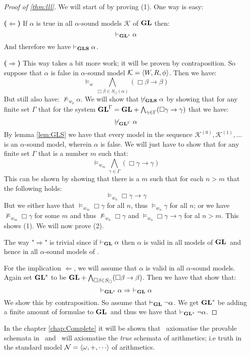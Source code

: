 \documentclass[../main.tex]{subfiles}
\begin{document}
\begin{proof}[Proof of \ref{thm:lll}]
	We will start of by proving (1). One way is easy:

	\textbf{($\Leftarrow$)} If $\alpha$ is true in all $\alpha$-sound
	models $\mathcal{K}$ of $\text{\textbf{GL}}$ then:
	$$\vdash_{\text{\textbf{GL}}^s}\alpha$$
	And therefore we have $\vdash_{\text{\textbf{GLS}}}\alpha$.

	\textbf{($\Rightarrow$)} This way takes a bit more work; it will be
	proven by contraposition. So suppose that $\alpha$ is false in
	$\alpha$-sound model $\mathcal{K}=\langle W,R,\phi\rangle$. Then we have:
	$$\vDash_w\bigwedge_{\Box\beta\in
	S_\Box(\alpha)}(\Box\beta\rightarrow\beta)$$
	But still also have: $\not\vDash_{w_0}\alpha$. We will show that
	$\not\vdash_{\text{\textbf{GLS}}}\alpha$ by showing that for any finite set $\Gamma$
	that for the system
	$\text{\textbf{GL}}^\Gamma=\text{\textbf{GL}}+\bigwedge_{\gamma\in\Gamma}(\Box\gamma\rightarrow\gamma)$
	that we have:
	$$\not\vdash_{\text{\textbf{GL}}^\Gamma}\alpha$$
	By lemma \ref{lem:GLS} we have that every  model in the sequence
	$\mathcal{K}^{(0)},\mathcal{K}^{(1)},\ldots$ is an $\alpha$-sound
	model, wherein $\alpha$ is false. We will just have to show that for
	any finite set $\Gamma$ that is a number $m$ such that:
	$$\vDash_{w_m}\bigwedge_{\gamma\in\Gamma}(\Box\gamma\rightarrow\gamma)$$
	This can be shown by showing that there is a $m$ such that for each
	$n>m$ that the following holds:
	$$\vDash_{w_n}\Box\gamma\rightarrow\gamma$$
	But we either have that $\vDash_{w_m}\Box\gamma$ for all $n$, thus
	$\vDash_{w_n}\gamma$ for all $n$; or we have
	$\not\vDash_{w_m}\Box\gamma$ for some $m$ and thus
	$\not\vDash_{w_n}\Box\gamma$ and
	$\vDash_{w_n}\Box\gamma\rightarrow\gamma$ for al $n>m$. This shows (1).
	We will now prove (2).

	The way "$\Rightarrow$" is trivial since if $\vdash_{\text{\textbf{GL}}}\alpha$ then
	$\alpha$ is valid in all models of $\text{\textbf{GL}}$\ and hence in all
	$\alpha$-sound models of \GL.
	
	For the implication $\Leftarrow$, we will assume that $\alpha$ is valid
	in all $\alpha$-sound models.  Again set $\text{\textbf{GL}}^s$ to be
	$\text{\textbf{GL}}+\bigwedge_{\Box\beta\in S_\Box}(\Box\beta\rightarrow\beta)$. Then
	we have that show that:
	\[\vdash_{\GL^s}\alpha\Rightarrow\ \vdash_\GL\alpha\]
	We show this by contraposition. So assume that $\vdash_{\text{\textbf{GL}}}\neg\alpha$.
	We get $\text{\textbf{GL}}^s$ be adding a finite amount of formulae to $\text{\textbf{GL}}$\ and thus
	we have that $\vdash_{\text{\textbf{GL}}^s}\neg\alpha$.
\end{proof}
In the chapter \ref{chap:Complete} it will be shown that \GL\ axiomatise the
provable schemata in \PRA\ and \GLS\ will axiomatise the \textit{true} schemata
of arithmetics; i.e truth in the standard model $\mathcal{N}=\la
\omega,+,\cdots\ra$ of arithmetics.
\end{document}
